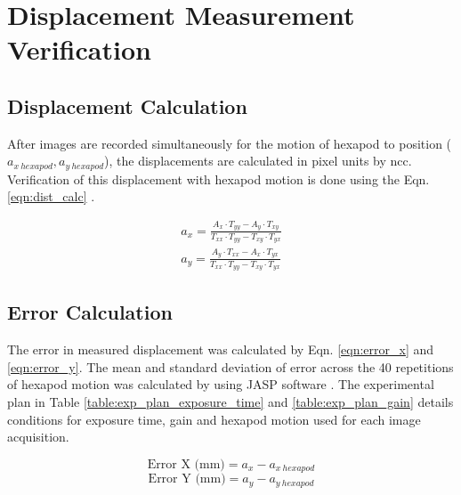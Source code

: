     
    \section{Displacement Measurement Verification}
        \subsection*{Displacement Calculation}
            \noindent After images are recorded simultaneously for the motion of hexapod to position (\(a_{x\ hexapod}, a_{y\ hexapod}\)), the displacements are calculated in pixel units by \gls{ncc}. Verification of this displacement with hexapod motion is done using the Eqn. \ref{eqn:dist_calc} \cite{charrett_2018}. 

            \begin{equation}\label{eqn:dist_calc}
                \begin{aligned}
                    a_x = \frac{A_x \cdot T_{yy} - A_y \cdot T_{xy}}{T_{xx} \cdot T_{yy} - T_{xy} \cdot T_{yx}} \\
                    a_y = \frac{A_y \cdot T_{xx} - A_x \cdot T_{yx}}{T_{xx} \cdot T_{yy} - T_{xy} \cdot T_{yx}}
                \end{aligned}
            \end{equation}

        \subsection*{Error Calculation}
            The error in measured displacement was calculated by Eqn. \ref{eqn:error_x} and \ref{eqn:error_y}. The mean and standard deviation of error across the 40 repetitions of hexapod motion was calculated by using JASP software \cite{jasp_2023}. The experimental plan in Table \ref{table:exp_plan_exposure_time} and \ref{table:exp_plan_gain} details conditions for exposure time, gain and hexapod motion used for each image acquisition.
            

            \begin{equation}\label{eqn:error_x}
                \text{Error X (mm)} = a_x - a_{x\ hexapod}
            \end{equation}
            \begin{equation}\label{eqn:error_y}
                \text{Error Y (mm)} = a_y - a_{y\ hexapod}
            \end{equation}


